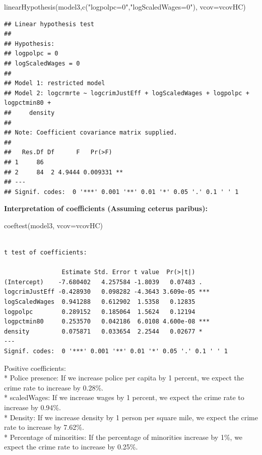 \documentclass[]{article}
\newenvironment{Shaded}{}{}
\newcommand{\DataTypeTok}[1]{#1}
\newcommand{\KeywordTok}[1]{\textcolor[rgb]{0.00,0.00,1.00}{#1}}
\newcommand{\NormalTok}[1]{#1}
\newcommand{\StringTok}[1]{\textcolor[rgb]{0.00,0.50,0.50}{#1}}
\begin{document}
\begin{Shaded}
\begin{Highlighting}[]
\KeywordTok{linearHypothesis}\NormalTok{(model3,}\KeywordTok{c}\NormalTok{(}\StringTok{"logpolpc=0"}\NormalTok{,}\StringTok{"logScaledWages=0"}\NormalTok{), }\DataTypeTok{vcov=}\NormalTok{vcovHC)}
\end{Highlighting}
\end{Shaded}

\begin{verbatim}
## Linear hypothesis test
## 
## Hypothesis:
## logpolpc = 0
## logScaledWages = 0
## 
## Model 1: restricted model
## Model 2: logcrmrte ~ logcrimJustEff + logScaledWages + logpolpc + logpctmin80 + 
##     density
## 
## Note: Coefficient covariance matrix supplied.
## 
##   Res.Df Df      F   Pr(>F)   
## 1     86                      
## 2     84  2 4.9444 0.009331 **
## ---
## Signif. codes:  0 '***' 0.001 '**' 0.01 '*' 0.05 '.' 0.1 ' ' 1
\end{verbatim}

\textbf{Interpretation of coefficients (Assuming ceterus paribus):}

\begin{Shaded}
\begin{Highlighting}[]
\KeywordTok{coeftest}\NormalTok{(model3, }\DataTypeTok{vcov=}\NormalTok{vcovHC)}
\end{Highlighting}
\end{Shaded}

\begin{verbatim}

t test of coefficients:

                Estimate Std. Error t value  Pr(>|t|)    
(Intercept)    -7.680402   4.257584 -1.8039   0.07483 .  
logcrimJustEff -0.428930   0.098282 -4.3643 3.609e-05 ***
logScaledWages  0.941288   0.612902  1.5358   0.12835    
logpolpc        0.289152   0.185064  1.5624   0.12194    
logpctmin80     0.253570   0.042186  6.0108 4.600e-08 ***
density         0.075871   0.033654  2.2544   0.02677 *  
---
Signif. codes:  0 '***' 0.001 '**' 0.01 '*' 0.05 '.' 0.1 ' ' 1
\end{verbatim}

Positive coefficients:\\
* Police presence: If we increase police per capita by 1 percent, we
expect the crime rate to increase by 0.28\%.\\
* scaledWages: If we increase wages by 1 percent, we expect the crime
rate to increase by 0.94\%.\\
* Density: If we increase density by 1 person per square mile, we expect
the crime rate to increase by 7.62\%.\\
* Percentage of minorities: If the percentage of minorities increase by
1\%, we expect the crime rate to increase by 0.25\%.
\end{document}

